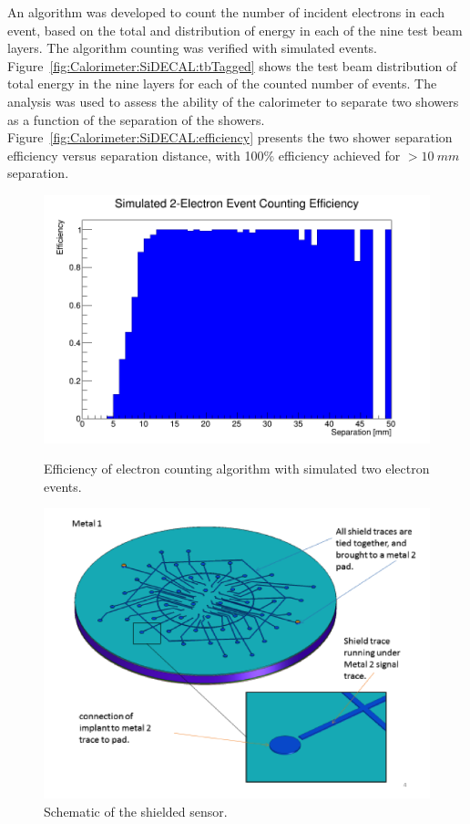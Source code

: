 An algorithm was developed to count the number of incident electrons in each event, based on the total and distribution of energy in each of the nine test beam layers. The algorithm counting was verified with simulated events. Figure~\ref{fig:Calorimeter:SiDECAL:tbTagged} shows the test beam distribution of total energy in the nine layers for each of the counted number of events. The analysis was used to assess the ability of the calorimeter to separate two showers as a function of the separation of the showers. Figure~\ref{fig:Calorimeter:SiDECAL:efficiency} presents the two shower separation efficiency versus separation distance, with 100\% efficiency achieved for $>\SI{10}{mm}$ separation.

\begin{figure}
	\centering
	\begin{minipage}[b]{.49\textwidth}
		\includegraphics[width=\linewidth,valign=t]{Calorimeter/SiliconTungstenSiD/efficiency.png}
		\caption{Efficiency of electron counting algorithm with simulated two electron events.}
		\label{fig:Calorimeter:SiDECAL:efficiency}
	\end{minipage}\hfill
	\begin{minipage}[b]{.49\textwidth}
		\includegraphics[width=\linewidth,valign=t]{Calorimeter/SiliconTungstenSiD/shield.png}
		\caption{Schematic of the shielded sensor.}
		\label{fig:Calorimeter:SiDECAL:shield}
	\end{minipage}
\end{figure}

